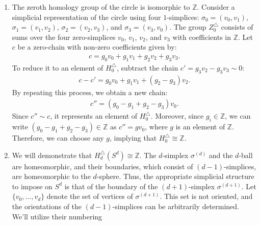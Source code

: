 \begin{example}\noindent
	\begin{enumerate}
		\item The zeroth homology group of the circle is isomorphic to \(\mathbb{Z}\).
		      Consider a simplicial representation of the circle using four \(1\)-simplices:
		      \(\sigma_{0} = (v_{0}, v_{1})\), \(\sigma_{1} = (v_{1}, v_{2})\), \(\sigma_{2} = (v_{2}, v_{3})\), and \(\sigma_{3} = (v_{3}, v_{0})\).
		      The group \(Z^{\triangle}_{0}\) consists of sums over the four zero-simplices \(v_{0}\),
		      \(v_{1}\), \(v_{2}\), and \(v_{3}\) with coefficients in \(\mathbb{Z}\). Let \(c\) be a zero-chain
		      with non-zero coefficients given by:
		      \begin{align}
		      	c = g_{0} v_{0} + g_{1} v_{1} + g_{2} v_{2} + g_{3} v_{3}. 
		      \end{align}
		      To reduce it to an element of \(H^{\triangle}_{0}\), subtract the chain \(c' = g_{3} v_{2} - g_{3} v_{3} \sim 0\):
		      \begin{align}
		      	c - c' = g_{0} v_{0} + g_{1} v_{1} + (g_{2} - g_{3}) v_{2}. 
		      \end{align}
		      By repeating this process, we obtain a new chain:
		      \begin{align}
		      	c'' = (g_{0} - g_{1} + g_{2} - g_{3}) v_{0}. 
		      \end{align}
		      Since \(c'' \sim c\), it represents an element of \(H^{\triangle}_{0}\). Moreover,
		      since \(g_{i} \in \mathbb{Z}\), we can write
		      \((g_{0} - g_{1} + g_{2} - g_{3}) \in \mathbb{Z}\) as \(c'' = g v_{0}\), where \(g\)
		      is an element of \(\mathbb{Z}\). Therefore, we can choose any \(g\), implying
		      that \(H^{\triangle}_{0} \cong \mathbb{Z}\).		      		      		      
		\item We will demonstrate that \(H^{\triangle}_{d}(S^{d}) \cong \mathbb{Z}\). The
		      \(d\)-simplex \(\sigma^{(d)}\) and the \(d\)-ball are homeomorphic, and their boundaries,
		      which consist of \((d-1)\)-simplices, are homeomorphic to the \(d\)-sphere.
		      Thus, the appropriate simplicial structure to impose on \(S^{d}\) is that of
		      the boundary of the \((d+1)\)-simplex \(\sigma^{(d+1)}\). Let
		      \(\{v_{0}, \ldots, v_{d}\}\) denote the set of vertices of
		      \(\sigma^{(d+1)}\). This set is not oriented, and the orientations of the
		      \((d-1)\)-simplices can be arbitrarily determined. We'll utilize their numbering

\end{enumerate}
\end{example}
